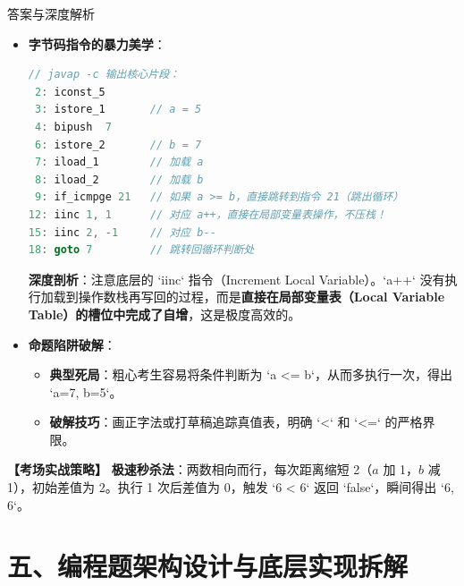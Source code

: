 \documentclass[12pt, a4paper]{ctexart}
\begin{document}
\begin{enumerate}[label=\textbf{\arabic*.}]
\begin{bluebox}{答案与深度解析}
\begin{itemize}[leftmargin=*, nosep]
			      \item \textbf{字节码指令的暴力美学}：
			            \begin{lstlisting}[language=Java]
// javap -c 输出核心片段：
 2: iconst_5
 3: istore_1       // a = 5
 4: bipush  7
 6: istore_2       // b = 7
 7: iload_1        // 加载 a
 8: iload_2        // 加载 b
 9: if_icmpge 21   // 如果 a >= b，直接跳转到指令 21（跳出循环）
12: iinc 1, 1      // 对应 a++，直接在局部变量表操作，不压栈！
15: iinc 2, -1     // 对应 b--
18: goto 7         // 跳转回循环判断处
                \end{lstlisting}
			            \textbf{深度剖析}：注意底层的 `iinc` 指令（Increment Local Variable）。`a++` 没有执行加载到操作数栈再写回的过程，而是\textbf{直接在局部变量表（Local Variable Table）的槽位中完成了自增}，这是极度高效的。

			      \item \textbf{命题陷阱破解}：
			            \begin{itemize}
				            \item \textbf{典型死局}：粗心考生容易将条件判断为 `a <= b`，从而多执行一次，得出 `a=7, b=5`。
				            \item \textbf{破解技巧}：画正字法或打草稿追踪真值表，明确 `<` 和 `<=` 的严格界限。
			            \end{itemize}
		      \end{itemize}

		      \textbf{【考场实战策略】}
		      \textbf{极速秒杀法}：两数相向而行，每次距离缩短 2（$a$ 加 1，$b$ 减 1），初始差值为 2。执行 1 次后差值为 0，触发 `6 < 6` 返回 `false`，瞬间得出 `6, 6`。
	      \end{bluebox}
\end{enumerate}

\newpage
\section{五、编程题架构设计与底层实现拆解}
\end{document}
